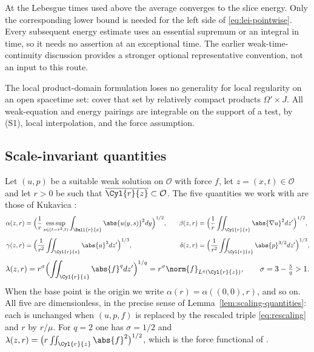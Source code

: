 \documentclass[11pt,reqno]{amsart}
\begin{document}
\begin{remark}\label{rem:lei-direction}
At the Lebesgue times used above the average converges to the slice
energy. Only the corresponding lower bound is needed for the left side
of \eqref{eq:lei-pointwise}. Every subsequent energy estimate uses an
essential supremum or an integral in time, so it needs no assertion at
an exceptional time. The earlier weak-time-continuity discussion provides
a stronger optional representative convention, not an input to this route.
\end{remark}

The local product-domain formulation loses no generality for local
regularity on an open spacetime set: cover that set by relatively compact
products $\Omega'\times J$. All weak-equation and energy pairings are
integrable on the support of a test, by (S1), local interpolation, and the
force assumption.

\subsection{Scale-invariant quantities}\label{ss:quantities}

Let $(u,p)$ be a suitable weak solution on $\mathcal{O}$ with force $f$, let
$z=(x,t)\in\mathcal{O}$ and let $r>0$ be such that
$\overline{\Cyl{r}{z}}\subset\mathcal{O}$. The five quantities we work with are those of
Kukavica \cite[\S2]{Kukavica2008}:
\begin{equation}\label{eq:alpha-beta}
\begin{aligned}
  \alpha(z,r)&=\Bigl(\frac1r\operatorname*{ess\,sup}_{s\in(t-r^{2},t)}
      \int_{\Ball{r}{x}}\abs{u(y,s)}^{2}dy\Bigr)^{1/2},
  &\quad
  \beta(z,r)&=\Bigl(\frac1r\iint_{\Cyl{r}{z}}\abs{\nabla u}^{2}dz'\Bigr)^{1/2},\\[4pt]
  \gamma(z,r)&=\Bigl(\frac1{r^{2}}\iint_{\Cyl{r}{z}}\abs{u}^{3}dz'\Bigr)^{1/3},
  &\quad
  \delta(z,r)&=\Bigl(\frac1{r^{2}}\iint_{\Cyl{r}{z}}\abs{p}^{3/2}dz'\Bigr)^{1/3},
\end{aligned}
\end{equation}
\begin{equation}\label{eq:lambda}
  \lambda(z,r)=r^{\sigma}\Bigl(\iint_{\Cyl{r}{z}}\abs{f}^{q}dz'\Bigr)^{1/q}
              =r^{\sigma}\norm{f}_{L^{q}(\Cyl{r}{z})},
  \qquad \sigma=3-\tfrac5q>1 .
\end{equation}
When the base point is the origin we write $\alpha(r)=\alpha((0,0),r)$, and so
on. All five are dimensionless, in the precise sense of
Lemma~\ref{lem:scaling-quantities}: each is unchanged when $(u,p,f)$ is replaced
by the rescaled triple \eqref{eq:rescaling} and $r$ by $r/\mu$. For $q=2$ one has
$\sigma=1/2$ and $\lambda(z,r)=\bigl(r\iint_{\Cyl{r}{z}}\abs{f}^{2}\bigr)^{1/2}$,
which is the force functional of \cite[\S2]{Kukavica2008}.
\end{document}
